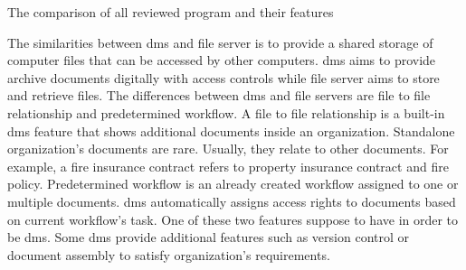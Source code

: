 \begin{table}
	\centering
	
	\caption{The comparison of all reviewed program and their features}
	\label{tbl:feature-sum}
\end{table}

\clearpage

The similarities between \gls{dms} and file server is to provide a shared storage of computer files that can be accessed by other computers.
\gls{dms} aims to provide archive documents digitally with access controls while file server aims to store and retrieve files.
The differences between \gls{dms} and file servers are file to file relationship and predetermined workflow.
A file to file relationship is a built-in \gls{dms} feature that shows additional documents inside an organization.
Standalone organization's documents are rare.
Usually, they relate to other documents.
For example, a fire insurance contract refers to property insurance contract and fire policy.
Predetermined workflow is an already created workflow assigned to one or multiple documents.
\gls{dms} automatically assigns access rights to documents based on current workflow's task.
One of these two features suppose to have in order to be \gls{dms}.
Some \gls{dms} provide additional features such as version control or document assembly to satisfy organization's requirements.